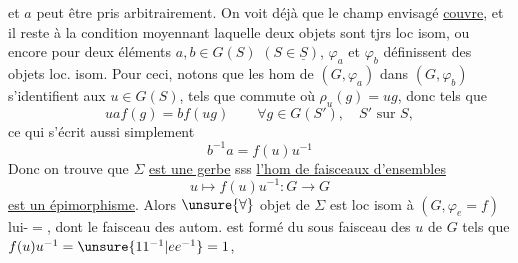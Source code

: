 et $a$ peut être pris arbitrairement. On voit déjà
que le champ envisagé \uline{couvre}, et il reste
à  la condition moyennant laquelle deux
objets sont tjrs loc isom, ou encore
pour deux éléments $a,b\in G(S)$ $(S\in\underline S)$,
$\varphi_a$ et $\varphi_b$ définissent des objets loc. isom.
Pour ceci, notons que les hom de
$(G,\varphi_a)$ dans $(G,\varphi_b)$ s'identifient aux $u\in G(S)$,
tels que
commute
où $\rho_u(g)=ug$, donc tels que
\[
u a f(g)=b f(ug)\qquad \forall g\in G(S'),\quad S'\text{ sur }S,
\]
ce qui s'écrit aussi simplement
\[
b^{-1}a=f(u)u^{-1}
\]
Donc on trouve que $\Sigma$ \uline{est une gerbe} sss
\uline{l'hom de faisceaux d'ensembles}
\[
u\longmapsto f(u)u^{-1}:G\longrightarrow G
\]
\uline{est un épimorphisme}. Alors $\unsure{\forall}$ objet de
$\Sigma$ est loc isom à $(G,\varphi_e=f)$ lui-$=$,
dont le faisceau des autom. est formé du
sous faisceau des $u$ de $G$ tels que $f(u)u^{-1}=\unsure{11^{-1}|ee^{-1}}=1$,
